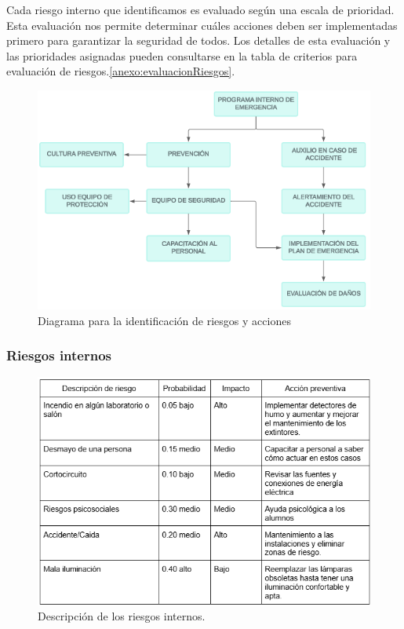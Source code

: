     Cada riesgo interno que identificamos es evaluado según una escala de prioridad. Esta evaluación nos permite determinar cuáles acciones deben ser implementadas primero para garantizar la seguridad de todos. Los detalles de esta evaluación y las prioridades asignadas pueden consultarse en la tabla de criterios para evaluación de riesgos.\ref{anexo:evaluacionRiesgos}. 
    
    \begin{figure}[H]
        \centering
        \includegraphics[scale=0.4]{35/Img/diagramaPE.png}
        \caption{Diagrama para la identificación de riesgos y acciones}
    \end{figure}
    
    \subsubsection{Riesgos internos}
    
    \begin{figure}[H]
        \centering
        \includegraphics[scale=0.5]{35/Img/riesgosInternos.png}
        \caption{Descripción de los riesgos internos.}
    \end{figure}
    
